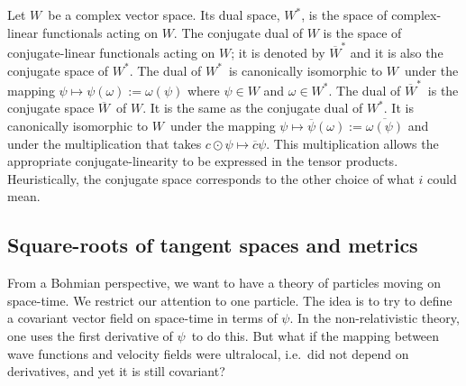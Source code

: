 \documentclass[11pt]{article}
\theoremstyle{remark}
\begin{document}
Let \ensuremath{W}\ be a complex vector space. Its dual space, \ensuremath{{\ensuremath{W}}^{*}}, is the
space of complex-linear functionals acting on \ensuremath{W}. The conjugate
dual of $\ensuremath{W}$ is the space of
conjugate-linear functionals acting on \ensuremath{W}; it is denoted  by 
\ensuremath{{\ensuremath{\overline{\ensuremath{W}}}}^{*}} and it is also the
conjugate space of \ensuremath{{\ensuremath{W}}^{*}}. The
dual of \ensuremath{{\ensuremath{W}}^{*}}\ is canonically 
isomorphic to \ensuremath{W}\ under the mapping 
 $\ensuremath{\psi} \mapsto \ensuremath{\psi}(\omega) \ensuremath{:=}
\omega(\ensuremath{\psi})$ where $\ensuremath{\psi} \in \ensuremath{W}$ and $\omega \in \ensuremath{{\ensuremath{W}}^{*}}$. 
The dual of \ensuremath{{\ensuremath{\overline{\ensuremath{W}}}}^{*}}\ is the conjugate space
\ensuremath{\overline{\ensuremath{W}}}\ of \ensuremath{W}. It is the same as the conjugate dual of \ensuremath{{\ensuremath{W}}^{*}}. It
is canonically isomorphic to \ensuremath{W}\ under the  mapping 
$\ensuremath{\psi} \mapsto \ensuremath{\overline{\ensuremath{\psi}}} (\omega) \ensuremath{:=} \ensuremath{\overline{\omega(\ensuremath{\psi})}}$ 
and under the
multiplication that takes $c \odot \ensuremath{\psi} \mapsto \ensuremath{\overline{c}}\ensuremath{\psi}$. This
multiplication allows the appropriate conjugate-linearity to be
expressed in the tensor products. Heuristically, the conjugate space
corresponds to the other choice of what $i$ could mean.


\subsection{Square-roots of tangent spaces and metrics}

From a Bohmian perspective, we want to have a theory of particles
moving on space-time. We restrict our attention to one particle. 
The idea is to try to define a covariant vector field on
space-time in terms of \ensuremath{\psi}. In the non-relativistic theory, one uses the first
derivative of \ensuremath{\psi}\ to do this. But what if the mapping between wave functions
and velocity fields were ultralocal, i.e.\ did not depend on
derivatives, and yet it is still covariant? 
\end{document}
